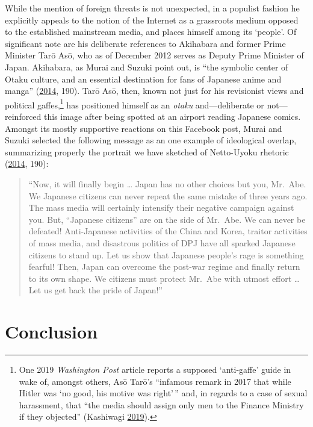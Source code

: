 \documentclass[10pt,british,A4paper,twoside]{memoir}
\begin{document}
While the mention of foreign threats is not unexpected, in a populist
fashion he explicitly appeals to the notion of the Internet as a
grassroots medium opposed to the established mainstream media, and
places himself among its `people'. Of significant note are his
deliberate references to Akihabara and former Prime Minister Tarō Asō,
who as of December 2012 serves as Deputy Prime Minister of Japan.
Akihabara, as Murai and Suzuki point out, is ``the symbolic center of
Otaku culture, and an essential destination for fans of Japanese anime
and manga'' (\protect\hyperlink{ref-hollihan_how_2014}{2014}, 190). Tarō
Asō, then, known not just for his revisionist views and political
gaffes,\footnote{One 2019 \emph{Washington Post} article reports a
  supposed `anti-gaffe' guide in wake of, amongst others, Asō Tarō's
  ``infamous remark in 2017 that while Hitler was `no good, his motive
  was right'\,'' and, in regards to a case of sexual harassment, that
  ``the media should assign only men to the Finance Ministry if they
  objected'' (Kashiwagi
  \protect\hyperlink{ref-kashiwagi_japan_2019}{2019}).} has positioned
himself as an \emph{otaku} and---deliberate or not---reinforced this
image after being spotted at an airport reading Japanese comics. Amongst
its mostly supportive reactions on this Facebook post, Murai and Suzuki
selected the following message as an one example of ideological overlap,
summarizing properly the portrait we have sketched of Netto-Uyoku
rhetoric (\protect\hyperlink{ref-hollihan_how_2014}{2014}, 190):

\begin{quote}
``Now, it will finally begin \ldots{} Japan has no other choices but
you, Mr.~Abe. We Japanese citizens can never repeat the same mistake of
three years ago. The mass media will certainly intensify their negative
campaign against you. But, ``Japanese citizens'' are on the side of
Mr.~Abe. We can never be defeated! Anti-Japanese activities of the China
and Korea, traitor activities of mass media, and disastrous politics of
DPJ have all sparked Japanese citizens to stand up. Let us show that
Japanese people's rage is something fearful! Then, Japan can overcome
the post-war regime and finally return to its own shape. We citizens
must protect Mr.~Abe with utmost effort \ldots{} Let us get back the
pride of Japan!''
\end{quote}

\section{Conclusion}\label{conclusion}
\end{document}
